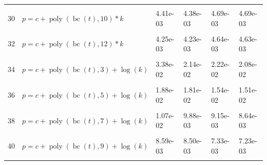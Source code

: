 \documentclass[12pt,a4paper]{article}
\DeclareMathOperator{\bc}{bc}
\DeclareMathOperator{\poly}{poly}
\begin{document}
\begin{longtable}[t]{ll>{\raggedleft\arraybackslash}p{2cm}>{\raggedleft\arraybackslash}p{2cm}>{\raggedleft\arraybackslash}p{2cm}>{\raggedleft\arraybackslash}p{2cm}}
\cellcolor{gray!6}{29} & \cellcolor{gray!6}{$p = c + \poly\left( \bc(t), 9 \right) * k$} & \cellcolor{gray!6}{4.90e-03} & \cellcolor{gray!6}{4.77e-03} & \cellcolor{gray!6}{5.24e-03} & \cellcolor{gray!6}{5.14e-03}\\
30 & $p = c + \poly\left( \bc(t), 10 \right) * k$ & 4.41e-03 & 4.38e-03 & 4.69e-03 & 4.69e-03\\
\cellcolor{gray!6}{31} & \cellcolor{gray!6}{$p = c + \poly\left( \bc(t), 11 \right) * k$} & \cellcolor{gray!6}{4.27e-03} & \cellcolor{gray!6}{4.24e-03} & \cellcolor{gray!6}{4.67e-03} & \cellcolor{gray!6}{4.65e-03}\\
32 & $p = c + \poly\left( \bc(t), 12 \right) * k$ & 4.25e-03 & 4.23e-03 & 4.64e-03 & 4.63e-03\\
\cellcolor{gray!6}{33} & \cellcolor{gray!6}{$p = c + \poly\left( \bc(t), 13 \right) * k$} & \cellcolor{gray!6}{4.19e-03} & \cellcolor{gray!6}{4.18e-03} & \cellcolor{gray!6}{4.60e-03} & \cellcolor{gray!6}{4.60e-03}\\
34 & $p = c + \poly\left( \bc(t), 3 \right) + \log(k)$ & 3.38e-02 & 2.14e-02 & 2.22e-02 & 2.08e-02\\
\cellcolor{gray!6}{35} & \cellcolor{gray!6}{$p = c + \poly\left( \bc(t), 4 \right) + \log(k)$} & \cellcolor{gray!6}{2.15e-02} & \cellcolor{gray!6}{2.04e-02} & \cellcolor{gray!6}{2.11e-02} & \cellcolor{gray!6}{2.05e-02}\\
36 & $p = c + \poly\left( \bc(t), 5 \right) + \log(k)$ & 1.88e-02 & 1.81e-02 & 1.54e-02 & 1.51e-02\\
\cellcolor{gray!6}{37} & \cellcolor{gray!6}{$p = c + \poly\left( \bc(t), 6 \right) + \log(k)$} & \cellcolor{gray!6}{1.07e-02} & \cellcolor{gray!6}{9.96e-03} & \cellcolor{gray!6}{9.40e-03} & \cellcolor{gray!6}{8.78e-03}\\
38 & $p = c + \poly\left( \bc(t), 7 \right) + \log(k)$ & 1.07e-02 & 9.88e-03 & 9.15e-03 & 8.64e-03\\
\cellcolor{gray!6}{39} & \cellcolor{gray!6}{$p = c + \poly\left( \bc(t), 8 \right) + \log(k)$} & \cellcolor{gray!6}{9.33e-03} & \cellcolor{gray!6}{8.98e-03} & \cellcolor{gray!6}{7.51e-03} & \cellcolor{gray!6}{7.46e-03}\\
40 & $p = c + \poly\left( \bc(t), 9 \right) + \log(k)$ & 8.59e-03 & 8.50e-03 & 7.33e-03 & 7.23e-03\\
\cellcolor{gray!6}{41} & \cellcolor{gray!6}{$p = c + \poly\left( \bc(t), 10 \right) + \log(k)$} & \cellcolor{gray!6}{8.31e-03} & \cellcolor{gray!6}{8.26e-03} & \cellcolor{gray!6}{6.93e-03} & \cellcolor{gray!6}{6.91e-03}\\

\end{longtable}
\end{document}
